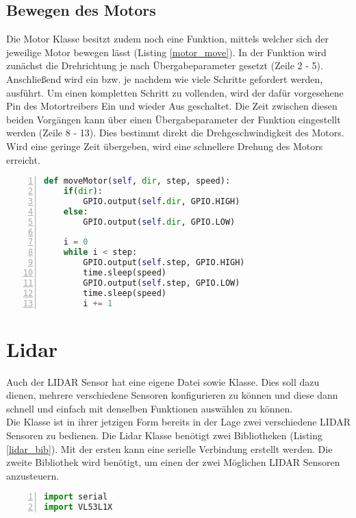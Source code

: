 \subsection{Bewegen des Motors}
Die Motor Klasse besitzt zudem noch eine Funktion, mittels welcher sich der jeweilige Motor bewegen lässt (Listing \ref{motor_move}). In der Funktion wird zunächst die Drehrichtung je nach Übergabeparameter gesetzt (Zeile 2 - 5). Anschließend wird ein bzw. je nachdem wie viele Schritte gefordert werden, ausführt. Um einen kompletten Schritt zu vollenden, wird der dafür vorgesehene Pin des Motortreibers Ein und wieder Aus geschaltet. Die Zeit zwischen diesen beiden Vorgängen kann über einen Übergabeparameter der Funktion eingestellt werden (Zeile 8 - 13). Dies bestimmt direkt die Drehgeschwindigkeit des Motors. Wird eine geringe Zeit übergeben, wird eine schnellere Drehung des Motors erreicht. 
\begin{lstlisting}[caption={Funktion zum Bewegen des Motors}, language={Python}, label={motor_move}, numbers=left]
def moveMotor(self, dir, step, speed):
    if(dir):
        GPIO.output(self.dir, GPIO.HIGH)
    else:
        GPIO.output(self.dir, GPIO.LOW)

    i = 0
    while i < step:
        GPIO.output(self.step, GPIO.HIGH)
        time.sleep(speed)
        GPIO.output(self.step, GPIO.LOW)
        time.sleep(speed)
        i += 1
\end{lstlisting}


\section{Lidar}
Auch der \ac{LIDAR} Sensor hat eine eigene Datei sowie Klasse. Dies soll dazu dienen, mehrere verschiedene Sensoren konfigurieren zu können und diese dann schnell und einfach mit denselben Funktionen auswählen zu können.\\
Die Klasse ist in ihrer jetzigen Form bereits in der Lage zwei verschiedene \ac{LIDAR} Sensoren zu bedienen.
Die Lidar Klasse benötigt zwei Bibliotheken (Listing \ref{lidar_bib}). Mit der ersten kann eine serielle Verbindung erstellt werden. Die zweite Bibliothek wird benötigt, um einen der zwei Möglichen \ac{LIDAR} Sensoren anzusteuern. 
\begin{lstlisting}[caption={Bibliotheken der Lidar Klasse}, language={Python}, label={lidar_bib}, numbers=left]
import serial
import VL53L1X
\end{lstlisting}

